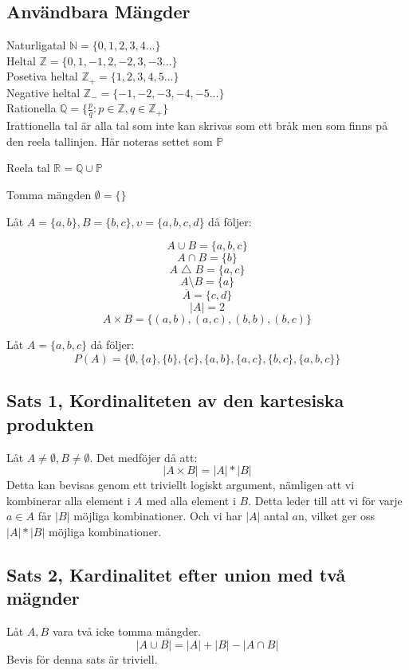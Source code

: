 \documentclass{article}
\begin{document}
	\subsection{Användbara Mängder}
	Naturligatal $\mathbb{N} = \{0, 1, 2, 3, 4...\}$\\
	Heltal $\mathbb{Z} = \{0, 1, -1, 2, -2, 3, -3...\}$\\
	Posetiva heltal $\mathbb{Z}_{+} = \{1, 2, 3, 4, 5...\}$\\
	Negative heltal $\mathbb{Z}_{-} = \{-1, -2, -3, -4, -5...\}$\\
	Rationella $\mathbb{Q} = \{\frac{p}{q} : p \in \mathbb{Z}, q \in \mathbb{Z}_{+}\}$\\

	Irattionella tal är alla tal som inte kan skrivas som ett bråk men som finns på den reela tallinjen. Här noteras settet som $\mathbb{P}$

	Reela tal \( \mathbb{R} = \mathbb{Q} \cup \mathbb{P} \)

	Tomma mängden $\emptyset = \{\}$

	Låt $A = \{a, b\}, B = \{b, c\}, \upsilon = \{a, b, c, d\}$ då följer:

	$$ A \cup B = \{a, b, c\} $$
	$$ A \cap B = \{b\} $$
	$$ A \bigtriangleup B = \{a, c\} $$
	$$ A \setminus B = \{a\} $$
	$$ \overline{A} = \{c, d\} $$
	$$ |A| = 2 $$
	$$ A \times B = \{(a, b), (a, c), (b, b), (b, c)\}$$

	Låt $A = \{a, b, c\}$ då följer: 
	$$ P(A) = \{\emptyset, \{a\}, \{b\}, \{c\}, \{a, b\}, \{a, c\}, \{b, c\}, \{a, b, c\}\} $$

	\subsection{Sats 1, Kordinaliteten av den kartesiska produkten}
	Låt $A \not= \emptyset, B \not= \emptyset$. Det medföjer då att:
	$$ |A \times B| = |A| * |B| $$ 
	Detta kan bevisas genom ett triviellt logiskt argument, nämligen att vi kombinerar alla element i $A$ med alla element i $B$. 
	Detta leder till att vi för varje $a \in A$ får $|B|$ möjliga kombinationer. Och vi har $|A|$ antal $a$n, vilket ger oss $ |A| * |B| $ möjliga kombinationer. 
	
	\subsection{Sats 2, Kardinalitet efter union med två mägnder}
	Låt $A, B$ vara två icke tomma mängder.
	$$ |A \cup B| = |A| + |B| - |A \cap B| $$
	Bevis för denna sats är triviell.
	
\end{document}
